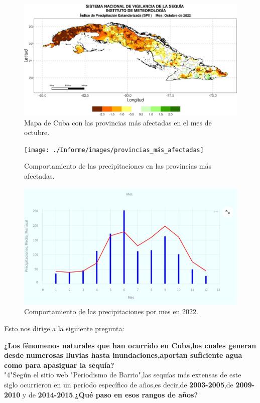 \documentclass[12pt]{article}
\begin{document}
\begin{figure}[H]
	\centering
	\includegraphics[width=0.8\linewidth]{./Informe/images/mapa_octubre_ismet}
	\caption{Mapa de Cuba con las provincias más afectadas en el mes de octubre.}
	\label{fig:mapaoctubreismet}
\end{figure}

\begin{figure}[H]
	\centering
	\texttt{[image: ./Informe/images/provincias\_más\_afectadas]}
	\caption{Comportamiento de las precipitaciones en las provincias más afectadas.}
	\label{fig:provinciasmasafectadas}
\end{figure}



\begin{figure}[H]
	\centering
	\includegraphics[width=0.8\linewidth]{./Informe/images/precipitaciones_2022}
	\caption{Comportamiento de las precipitaciones por mes en 2022.}
	\label{fig:precipitaciones2022}
\end{figure}


\newpage
Esto nos dirige a la siguiente pregunta:

\textbf{¿Los fénomenos naturales que han ocurrido en Cuba,los cuales generan desde numerosas lluvias hasta inundaciones,aportan suficiente agua como para apasiguar la sequía?}\\


"4"Según el sitio web "Periodismo de Barrio",las sequías más extensas de este siglo ocurrieron en un período específico de años,es decir,de \textbf{2003-2005},de \textbf{2009-2010} y de \textbf{2014-2015}.\textbf{¿Qué paso en esos rangos de años?}\\
\end{document}
